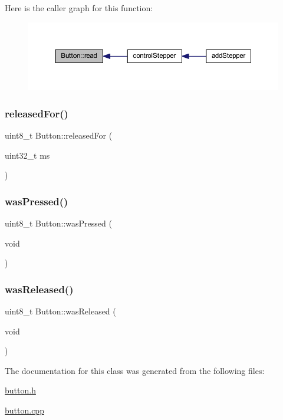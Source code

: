 Here is the caller graph for this function\+:
\nopagebreak
\begin{figure}[H]
\begin{center}
\leavevmode
\includegraphics[width=350pt]{d4/d77/class_button_a5f5c0d23ab0e5387b861e68019a7e85d_icgraph}
\end{center}
\end{figure}
\mbox{\label{class_button_a805e542eaf9976b7c1afaf3dfecc13a5}} 
\subsubsection{\texorpdfstring{released\+For()}{releasedFor()}}
{\footnotesize\ttfamily uint8\+\_\+t Button\+::released\+For (\begin{DoxyParamCaption}\item[{uint32\+\_\+t}]{ms }\end{DoxyParamCaption})}

\mbox{\label{class_button_a3496a1689b2b2f5635d5c7716f38ec43}} 
\subsubsection{\texorpdfstring{was\+Pressed()}{wasPressed()}}
{\footnotesize\ttfamily uint8\+\_\+t Button\+::was\+Pressed (\begin{DoxyParamCaption}\item[{void}]{ }\end{DoxyParamCaption})}

\mbox{\label{class_button_a79164a7fd70f08cb8c3930e8c06b9190}} 
\subsubsection{\texorpdfstring{was\+Released()}{wasReleased()}}
{\footnotesize\ttfamily uint8\+\_\+t Button\+::was\+Released (\begin{DoxyParamCaption}\item[{void}]{ }\end{DoxyParamCaption})}



The documentation for this class was generated from the following files\+:\begin{DoxyCompactItemize}
\item 
\hyperlink{button_8h}{button.\+h}\item 
\hyperlink{button_8cpp}{button.\+cpp}\end{DoxyCompactItemize}
